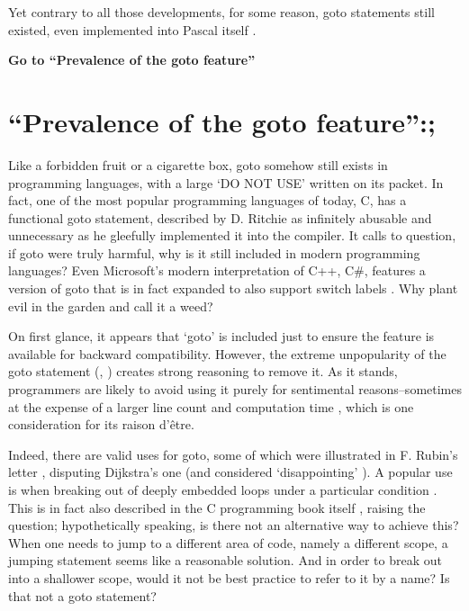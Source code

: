 \documentclass{journal}
\begin{document}
Yet contrary to all those developments, for some reason, goto statements still existed, even implemented into Pascal itself \cite{pascal}.

\textbf{Go to ``Prevalence of the goto feature''}

\setcounter{section}{2}
\section{``Prevalence of the goto feature'':;}
Like a forbidden fruit or a cigarette box, goto somehow still exists in programming languages, with a large `DO NOT USE' written on its packet. In fact, one of the most popular programming languages of today, C, has a functional goto statement, described by D. Ritchie as infinitely abusable and unnecessary \cite{cprogramming} as he gleefully implemented it into the compiler. It calls to question, if goto were truly harmful, why is it still included in modern programming languages? Even Microsoft's modern interpretation of C++, C\#, features a version of goto that is in fact expanded to also support switch labels \cite{csharp}. Why plant evil in the garden and call it a weed?

On first glance, it appears that `goto' is included just to ensure the feature is available for backward compatibility. However, the extreme unpopularity of the goto statement (\cite{goto}, \cite{againstgoto}) creates strong reasoning to remove it. As it stands, programmers are likely to avoid using it purely for sentimental reasons--sometimes at the expense of a larger line count and computation time \cite{caseforgoto}, which is one consideration for its raison d'être.

Indeed, there are valid uses for goto, some of which were illustrated in F. Rubin's letter \cite{gotoodeep}, disputing Dijkstra's one (and considered `disappointing' \cite{disappointing}). A popular use is when breaking out of deeply embedded loops under a particular condition \cite{gotoodeep}. This is in fact also described in the C programming book itself \cite{cprogramming}, raising the question; hypothetically speaking, is there not an alternative way to achieve this? When one needs to jump to a different area of code, namely a different scope, a jumping statement seems like a reasonable solution. And in order to break out into a shallower scope, would it not be best practice to refer to it by a name? Is that not a goto statement?
\end{document}
